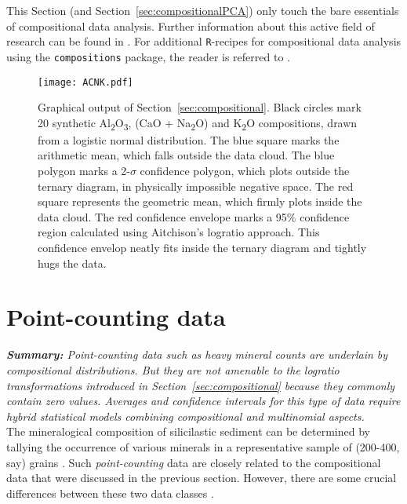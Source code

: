 \documentclass[11pt]{article}
\begin{document}
This Section (and Section~\ref{sec:compositionalPCA}) only touch the
bare essentials of compositional data analysis. Further information
about this active field of research can be found in
\citet{pawlowsky2015}. For additional \texttt{R}-recipes for
compositional data analysis using the \texttt{compositions} package,
the reader is referred to \citet{vandenboogaart2013}.

\begin{figure}[!ht]
  \begin{minipage}[c]{0.49\textwidth}
    \texttt{[image: ACNK.pdf]}
  \end{minipage}\hfill
  \begin{minipage}[c]{0.49\textwidth}
    \caption{Graphical output of Section~\ref{sec:compositional}.
      Black circles mark 20 synthetic
      Al\textsubscript{2}O\textsubscript{3}, (CaO +
      Na\textsubscript{2}O) and K\textsubscript{2}O compositions,
      drawn from a logistic normal distribution.  The blue square
      marks the arithmetic mean, which falls outside the data cloud.
      The blue polygon marks a 2-$\sigma$ confidence polygon, which
      plots outside the ternary diagram, in physically impossible
      negative space. The red square represents the geometric mean,
      which firmly plots inside the data cloud. The red confidence
      envelope marks a 95\% confidence region calculated using
      Aitchison's logratio approach. This confidence envelop neatly
      fits inside the ternary diagram and tightly hugs the data.}
    \label{fig:ACNK}
  \end{minipage}
\end{figure}

\section{Point-counting data}
\label{sec:counts}

\textit{\textbf{Summary:} Point-counting data such as heavy mineral
  counts are underlain by compositional distributions. But they are
  not amenable to the logratio transformations introduced in
  Section~\ref{sec:compositional} because they commonly contain zero
  values. Averages and confidence intervals for this type of data
  require hybrid statistical models combining compositional and
  multinomial aspects.}\\

The mineralogical composition of silicilastic sediment can be
determined by tallying the occurrence of various minerals in a
representative sample of (200-400, say) grains \citep{vanderplas1965,
  weltje2002}.  Such \emph{point-counting} data are closely related to
the compositional data that were discussed in the previous
section. However, there are some crucial differences between these two
data classes \citep{vermeesch2018d}.\\
\end{document}
